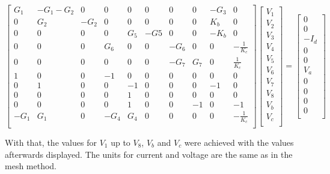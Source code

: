 \begin{equation}
	\begin{bmatrix}
		G_1 & -G_1-G_2 & 0 & 0 & 0 & 0 & 0 & 0 & -G_3 & 0\\
		0 & G_2 & -G_2 & 0 & 0 & 0 & 0 & 0 & K_b & 0\\
		0 & 0 & 0 & 0 & G_5 & -G5 & 0 & 0 & -K_b & 0 \\
		0 & 0 & 0 & G_6 & 0 & 0 & -G_6 & 0 & 0 & -\frac{1}{K_c} \\
		0 & 0 & 0 & 0 & 0 & 0 & -G_7 & G_7 & 0 & \frac{1}{K_c} \\
		1 & 0 & 0 & -1 & 0 & 0 & 0 & 0 & 0 & 0\\
		0 & 1 & 0 & 0 & -1 & 0 & 0 & 0 & -1 & 0\\
		0 & 0 & 0 & 0 & 1 & 0 & 0 & 0 & 0 & 0\\
		0 & 0 & 0 & 0 & 1 & 0 & 0 & -1 & 0 & -1\\
		-G_1 & G_1 & 0 & -G_4 & G_4 & 0 & 0 & 0 & 0 & -\frac{1}{K_c} \\
	\end{bmatrix}
	\begin{bmatrix}
		V_1     \\
		V_2     \\
		V_3  \\
		V_4  \\
		V_5  \\
		V_6   \\
		V_7   \\ 
		V_8     \\
		V_b     \\
		V_c       \\
	\end{bmatrix}
    =
	\begin{bmatrix}
		0     \\
		0     \\
		-I_d  \\
		0     \\
		0     \\
		V_a     \\
		0     \\
		0     \\
		0     \\
		0     \\
	\end{bmatrix}
	\label{matrixn}
\end{equation}

\par With that, the values for $V_1$ up to $V_8$, $V_b$ and $V_c$ were achieved with the values afterwards displayed. The units for current and voltage are the same as in the mesh method.

